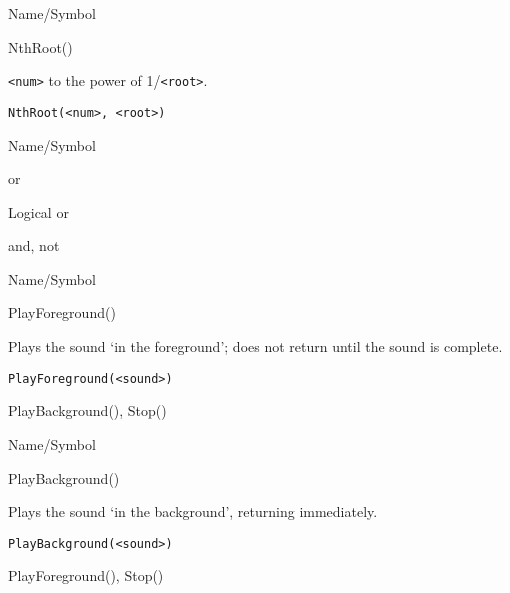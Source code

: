\rl


\begin{desc}{Name/Symbol}
\item[Name/Symbol]	NthRoot()

\item[Description]	\verb+<num>+ to the power of  1/\verb+<root>+.

\item[Usage]		
\begin{verbatim}
NthRoot(<num>, <root>)
\end{verbatim}

\item[Example]	

\item[See Also]	
\end{desc}

\rl


\begin{desc}{Name/Symbol}
\item[Name/Symbol]	or                   

\item[Description]	Logical or

\item[Usage]		

\item[Example]	

\item[See Also]	and, not
\end{desc}

\rl


\begin{desc}{Name/Symbol}
\item[Name/Symbol]	PlayForeground()  

\item[Description]	Plays the sound `in the foreground'; 
		does not return until the sound is complete.

\item[Usage]		
\begin{verbatim}
PlayForeground(<sound>)
\end{verbatim}

\item[Example]	

\item[See Also]	PlayBackground(), Stop()
\end{desc}

\rl


\begin{desc}{Name/Symbol}
\item[Name/Symbol]	PlayBackground()
 
\item[Description]	Plays the sound `in the background', returning immediately.

\item[Usage]		
\begin{verbatim}
PlayBackground(<sound>)
\end{verbatim}

\item[Example]	

\item[See Also]	PlayForeground(), Stop()
\end{desc}


